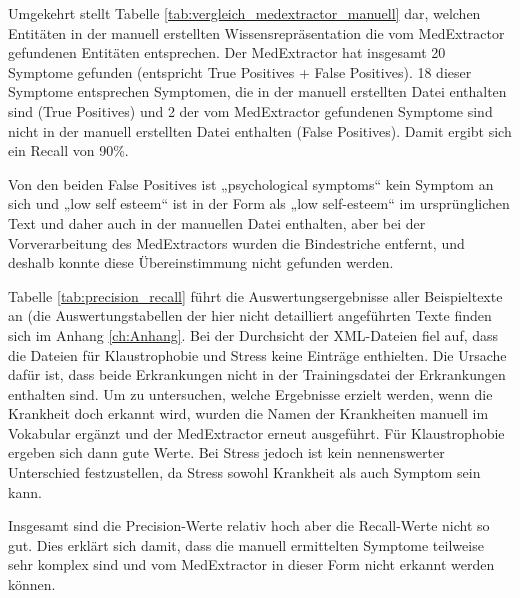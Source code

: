 Umgekehrt stellt Tabelle \ref{tab:vergleich_medextractor_manuell} dar, welchen Entitäten in der manuell erstellten Wissensrepräsentation die vom MedExtractor gefundenen Entitäten entsprechen. Der MedExtractor hat insgesamt 20 Symptome gefunden (entspricht True Positives + False Positives). 18 dieser Symptome entsprechen Symptomen, die in der manuell erstellten Datei enthalten sind (True Positives) und 2 der vom MedExtractor gefundenen Symptome sind nicht in der manuell erstellten Datei enthalten (False Positives). Damit ergibt sich ein Recall von 90\%. 

Von den beiden False Positives ist „psychological symptoms“ kein Symptom an sich und „low self esteem“ ist in der Form als „low self-esteem“ im ursprünglichen Text und daher auch in der manuellen Datei enthalten, aber bei der Vorverarbeitung des MedExtractors wurden die Bindestriche entfernt, und deshalb konnte diese Übereinstimmung nicht gefunden werden.


Tabelle \ref{tab:precision_recall} führt die Auswertungsergebnisse aller Beispieltexte an (die Auswertungstabellen der hier nicht detailliert angeführten Texte finden sich im Anhang \ref{ch:Anhang}. Bei der Durchsicht der XML-Dateien fiel auf, dass die Dateien für Klaustrophobie und Stress keine Einträge enthielten. Die Ursache dafür ist, dass beide Erkrankungen nicht in der Trainingsdatei der Erkrankungen enthalten sind. Um zu untersuchen, welche Ergebnisse erzielt werden, wenn die Krankheit doch erkannt wird, wurden die Namen der Krankheiten manuell im Vokabular ergänzt und der MedExtractor erneut ausgeführt. Für Klaustrophobie ergeben sich dann gute Werte. Bei Stress jedoch ist kein nennenswerter Unterschied festzustellen, da Stress sowohl Krankheit als auch Symptom sein kann.

Insgesamt sind die Precision-Werte relativ hoch aber die Recall-Werte nicht so gut. Dies erklärt sich damit, dass die manuell ermittelten Symptome teilweise sehr komplex sind und vom MedExtractor in dieser Form nicht erkannt werden können.

